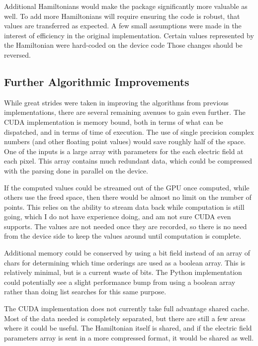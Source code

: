 \documentclass[fontsize=11pt]{scrartcl}
\numberwithin{equation}{section}		%
\numberwithin{figure}{section}			%
\numberwithin{table}{section}				%
\begin{document}
Additional Hamiltonians would make the package significantly more valuable as well.
To add more Hamiltonians will require ensuring the code is robust, that values are transferred as expected.
A few small assumptions were made in the interest of efficiency in the original implementation.
Certain values represented by the Hamiltonian were hard-coded on the device code
Those changes should be reversed.

\subsection{Further Algorithmic Improvements}

While great strides were taken in improving the algorithms from previous implementations, there are several remaining avenues to gain even further.
The CUDA implementation is memory bound, both in terms of what can be dispatched, and in terms of time of execution.
The use of single precision complex numbers (and other floating point values) would save roughly half of the space.
One of the inputs is a large array with parameters for the each electric field at each pixel.
This array contains much redundant data, which could be compressed with the parsing done in parallel on the device.

If the computed values could be streamed out of the GPU once computed, while others use the freed space, then there would be almost no limit on the number of points.
This relies on the ability to stream data back while computation is still going, which I do not have experience doing, and am not sure CUDA even supports.
The values are not needed once they are recorded, so there is no need from the device side to keep the values around until computation is complete.

Additional memory could be conserved by using a bit field instead of an array of chars for determining which time orderings are used as a boolean array.
This is relatively minimal, but is a current waste of bits.
The Python implementation could potentially see a slight performance bump from using a boolean array rather than doing list searches for this same purpose.

The CUDA implementation does not currently take full advantage shared cache.
Most of the data needed is completely separated, but there are still a few areas where it could be useful.
The Hamiltonian itself is shared, and if the electric field parameters array is sent in a more compressed format, it would be shared as well.
\end{document}
